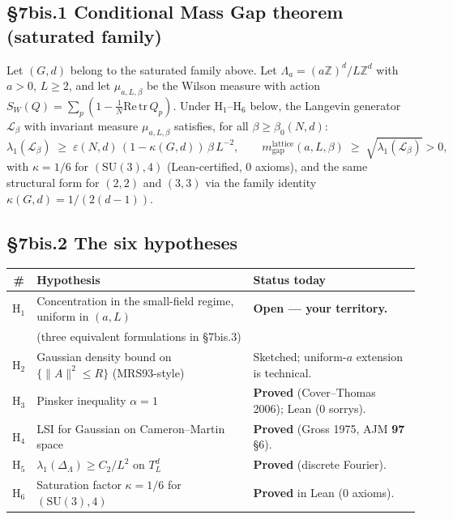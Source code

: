 \documentclass[11pt,a4paper]{article}
\newcommand{\Z}{\mathbb{Z}}
\newcommand{\SU}[1]{\mathrm{SU}(#1)}
\begin{document}
\subsection*{§7bis.1 Conditional Mass Gap theorem (saturated family)}

\begin{theorem}
Let $(G, d)$ belong to the saturated family above. Let $\Lambda_a = (a\Z)^d / L\Z^d$ with $a > 0$, $L \ge 2$, and let $\mu_{a, L, \beta}$ be the Wilson measure with action $S_W(Q) = \sum_p (1 - \tfrac{1}{N}\mathrm{Re}\,\mathrm{tr}\, Q_p)$. Under $\mathrm{H}_1$--$\mathrm{H}_6$ below, the Langevin generator $\mathcal{L}_\beta$ with invariant measure $\mu_{a, L, \beta}$ satisfies, for all $\beta \ge \beta_0(N, d)$:
\[
  \lambda_1(\mathcal{L}_\beta) \;\ge\; \varepsilon(N, d)\,(1 - \kappa(G, d))\,\beta\,L^{-2},
  \qquad
  m_{\mathrm{gap}}^{\mathrm{lattice}}(a, L, \beta) \;\ge\; \sqrt{\lambda_1(\mathcal{L}_\beta)} > 0,
\]
with $\kappa = 1/6$ for $(\SU{3}, 4)$ (Lean-certified, $0$ axioms), and the same structural form for $(2, 2)$ and $(3, 3)$ via the family identity $\kappa(G, d) = 1/(2(d-1))$.
\end{theorem}

\subsection*{§7bis.2 The six hypotheses}

\begin{center}
\small
\begin{tabular}{c|l|l}
\# & Hypothesis & Status today \\ \hline
$\mathrm{H}_1$ & Concentration in the small-field regime, uniform in $(a, L)$ & \textbf{Open --- your territory.} \\
       & (three equivalent formulations in §7bis.3) & \\
$\mathrm{H}_2$ & Gaussian density bound on $\{\|A\|^2 \le R\}$ (MRS93-style) & Sketched; uniform-$a$ extension is technical. \\
$\mathrm{H}_3$ & Pinsker inequality $\alpha = 1$ & \textbf{Proved} (Cover--Thomas 2006); Lean ($0$ sorrys). \\
$\mathrm{H}_4$ & LSI for Gaussian on Cameron--Martin space & \textbf{Proved} (Gross 1975, AJM \textbf{97} §6). \\
$\mathrm{H}_5$ & $\lambda_1(\Delta_\Lambda) \ge C_2/L^2$ on $T^d_L$ & \textbf{Proved} (discrete Fourier). \\
$\mathrm{H}_6$ & Saturation factor $\kappa = 1/6$ for $(\SU{3}, 4)$ & \textbf{Proved} in Lean ($0$ axioms). \\
\end{tabular}
\end{center}
\end{document}
